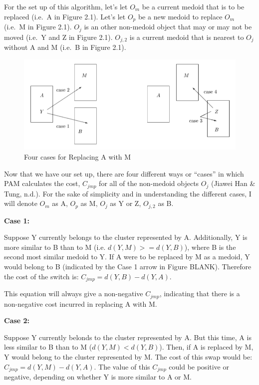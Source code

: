 \documentclass[12pt,twoside]{amherstthesis}
\begin{document}
  For the set up of this algorithm, let's let \(O_m\) be a current medoid
  that is to be replaced (i.e.~A in Figure 2.1). Let's let \(O_p\) be a
  new medoid to replace \(O_m\) (i.e.~M in Figure 2.1). \(O_j\) is an
  other non-medoid object that may or may not be moved (i.e.~Y and Z in
  Figure 2.1). \(O_{j,2}\) is a current medoid that is nearest to \(O_j\)
  without A and M (i.e.~B in Figure 2.1).
  
  \begin{figure}[htbp]
  \centering
  \includegraphics[scale = 0.5,angle = 0]{PAM_pic.png}
  \caption[Four cases for Replacing A with M]{\normalsize{Four cases for Replacing A with M}}
  \label{fig:PAM}
  \end{figure}
  
  Now that we have our set up, there are four different ways or ``cases''
  in which PAM calculates the cost, \(C_{jmp}\) for all of the non-medoid
  objects \(O_j\) (Jiawei Han \& Tung, n.d.). For the sake of simplicity
  and in understanding the different cases, I will denote \(O_m\) as A,
  \(O_p\) as M, \(O_j\) as Y or Z, \(O_{j,2}\) as B.
  
  \textbf{Case 1:}
  
  Suppose Y currently belongs to the cluster represented by A.
  Additionally, Y is more similar to B than to M (i.e.
  \(d(Y, M) >= d(Y, B)\)), where B is the second most similar medoid to Y.
  If A were to be replaced by M as a medoid, Y would belong to B
  (indicated by the Case 1 arrow in Figure BLANK). Therefore the cost of
  the switch is: \(C_{jmp} = d(Y, B) - d(Y, A)\).
  
  This equation will always give a non-negative \(C_{jmp}\), indicating
  that there is a non-negative cost incurred in replacing A with M.
  
  \textbf{Case 2:}
  
  Suppose Y currently belonds to the cluster represented by A. But this
  time, A is less similar to B than to M (\(d(Y, M) < d(Y, B)\)). Then, if
  A is replaced by M, Y would belong to the cluster represented by M. The
  cost of this swap would be: \(C_{jmp} = d(Y, M) - d(Y, A)\). The value
  of this \(C_{jmp}\) could be positive or negative, depending on whether
  Y is more similar to A or M.
  
\end{document}
